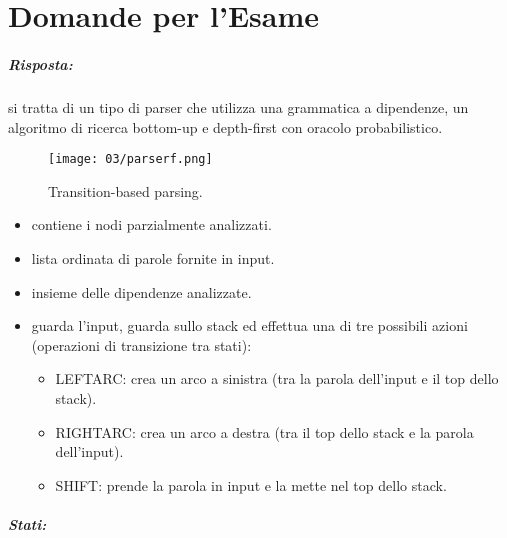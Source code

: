 \chapter{Domande per l'Esame}


\paragraph{Risposta:} si tratta di un tipo di parser che utilizza una grammatica a dipendenze, un algoritmo di ricerca bottom-up e depth-first con oracolo probabilistico.  

\begin{figure}[!h]
    \centering
    \texttt{[image: 03/parserf.png]}
    \caption{Transition-based parsing.}
\end{figure}

\begin{itemize}
  \item {} contiene i nodi parzialmente analizzati.
  \item {} lista ordinata di parole fornite in input.
  \item {} insieme delle dipendenze analizzate. 
  \item {} guarda l'input, guarda sullo stack ed effettua una di tre possibili azioni (operazioni di transizione tra stati):
    \begin{itemize}
      \item LEFTARC: crea un arco a sinistra (tra la parola dell'input e il top dello stack). 
      \item RIGHTARC: crea un arco a destra (tra il top dello stack e la parola dell'input). 
      \item SHIFT: prende la parola in input e la mette nel top dello stack.
    \end{itemize}
\end{itemize}



\paragraph{Stati:}

